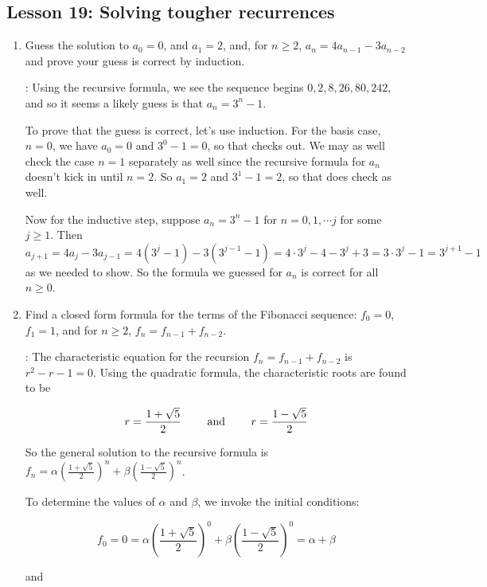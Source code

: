 \documentclass[11pt]{amsart}
\begin{document}
\subsection{Lesson 19: Solving tougher recurrences}

\begin{enumerate}

\item Guess the solution to $a_0=0$, and $a_1=2$, and, for $n\geq2$, $a_n = 4a_{n-1}-3a_{n-2}$
and prove your guess is correct by induction.

: Using the recursive formula, we see the sequence begins
$0, 2, 8, 26, 80, 242$, and so it seems a likely guess is that $a_n = 3^n -1$.

To prove that the guess is correct, let's use induction. For the basis case, $n=0$,
we have $a_0 = 0$ and $3^0-1 = 0$, so that checks out. We may as well check the case $n=1$
separately as well since the recursive formula for $a_n$ doesn't kick in until $n=2$.
So $a_1 = 2$ and $3^1-1=2$, so that does check as well.

Now for the inductive step, 
suppose $a_n = 3^n - 1$ for $n=0,1,\cdots j$ for some $j\geq 1$. Then 
$$a_{j+1} = 4a_j - 3a_{j-1} = 4(3^j-1) - 3(3^{j-1} - 1)
= 4\cdot3^j - 4 - 3^j + 3 = 3\cdot3^j - 1 = 3^{j+1}-1$$
as we needed to show. So the formula we guessed for $a_n$ is correct for all $n\geq 0$.

\medskip

\item Find a closed form formula for the terms of the Fibonacci sequence: $f_0=0$, $f_1=1$, and
for $n\geq 2$, $f_n=f_{n-1}+f_{n-2}$.

: The characteristic equation for the recursion $f_n=f_{n-1}+f_{n-2}$
is $r^2-r-1=0$. Using the quadratic formula, the characteristic roots are found to be

\[
r = {{1+\sqrt{5}}\over2} \qquad\text{ and }\qquad r = \frac{1-\sqrt{5}}{2}
\]

So the general solution to the recursive formula is 
$\displaystyle f_n = \alpha\left(\frac{1+\sqrt{5}}{2}\right)^n+\beta \left( \frac{1-\sqrt{5}}{2}\right)^n$.

To determine the values of $\alpha$ and $\beta$, we invoke the initial conditions:

\[
 f_0 = 0 = \alpha\left(\frac{1+\sqrt{5}}{2}\right)^0+\beta \left( \frac{1-\sqrt{5}}{2}\right)^0= \alpha+\beta
 \]

and


\end{enumerate}
\end{document}
